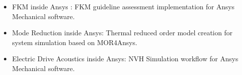 \documentclass[10pt,a4paper,ragged2e,withhyper]{altacv}
\begin{document}
\begin{paracol}{2}
\begin{itemize}
\item FKM inside Ansys : FKM guideline assessment implementation for Ansys Mechanical software. 
\item Mode Reduction inside Ansys: Thermal reduced order model creation for system simulation based on MOR4Ansys.
\item Electric Drive Acoustics inside Ansys: NVH Simulation workflow for Ansys Mechanical software.
\end{itemize}







\begin{comment}


\cvsection{A Day of My Life}

\hspace*{-1em}  %
\wheelchart{1.5cm}{0.5cm}{%
  10/13em/accent!30/Sleeping \& dreaming about work,
  25/9em/accent!60/Public resolving issues with Yahoo!\ investors,
  5/11em/accent!10/\footnotesize\\[1ex]New York \& San Francisco Ballet Jawbone board member,
  20/11em/accent!40/Spending time with family,
  5/8em/accent!20/\footnotesize Business development for Yahoo!\ after the Verizon acquisition,
  30/9em/accent/Showing Yahoo!\ \mbox{employees} that their work has meaning,
  5/8em/accent!20/Baking cupcakes
}



\end{comment}
\end{paracol}
\end{document}
